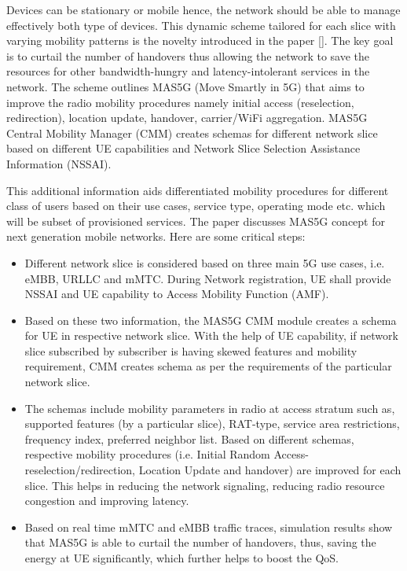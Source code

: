 \begin{multicols}{2}
Devices can be stationary or mobile hence, the network should be able to manage effectively both type of devices. This dynamic scheme tailored for each slice with varying mobility patterns is the novelty introduced in the paper [\cite{art1-key01}]. The key goal is to curtail the number of handovers thus allowing the network to save the resources for other bandwidth-hungry and latency-intolerant services in the network. The scheme outlines MAS5G (Move Smartly in 5G) that aims to improve the radio mobility procedures  namely initial access (reselection, redirection), location update, handover, carrier/WiFi aggregation. MAS5G Central Mobility Manager (CMM) creates schemas for different network slice based on different UE capabilities and Network Slice Selection Assistance Information (NSSAI). 

This additional information aids differentiated mobility procedures for different class of users based on their use cases, service type, operating mode etc. which will be subset of provisioned services. The paper discusses MAS5G concept for next generation mobile networks. Here are some critical steps:

\begin{itemize}

\item Different network slice is considered based on three main 5G use cases, i.e. eMBB, URLLC and mMTC. During Network registration, UE shall provide NSSAI and UE capability to Access Mobility Function  (AMF).

\item Based on these two information, the MAS5G CMM  module creates a schema for UE in respective network  slice. With the help of UE capability, if network slice subscribed by subscriber is having skewed features and mobility requirement, CMM creates schema as per the requirements of the particular network slice. 

\item The schemas include mobility parameters in radio at access stratum such as, supported features (by a particular slice), RAT-type, service area restrictions, frequency index, preferred neighbor list. Based on different schemas, respective mobility procedures (i.e. Initial Random Access-reselection/redirection, Location Update and handover) are improved for each slice. This helps in reducing the network signaling, reducing radio resource congestion and improving latency. 

\item Based on real time mMTC and eMBB traffic traces, simulation results show that MAS5G is able to curtail the number of handovers, thus, saving the energy at UE significantly, which further helps to boost the QoS.


\end{itemize}
\end{multicols}
